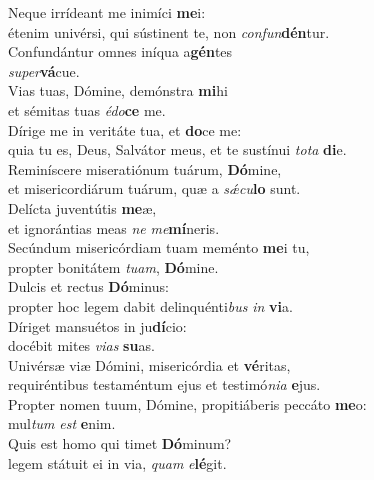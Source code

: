 \evenverse Neque irrídeant me inimíci \textbf{me}i:~\*\\
\evenverse étenim univérsi, qui sústinent te, non \textit{con}\textit{fun}\textbf{dén}tur.\\
\oddverse Confundántur omnes iníqua a\textbf{gén}tes~\*\\
\oddverse \textit{su}\textit{per}\textbf{vá}cue.\\
\evenverse Vias tuas, Dómine, demónstra \textbf{mi}hi~\*\\
\evenverse et sémitas tuas \textit{é}\textit{do}\textbf{ce} me.\\
\oddverse Dírige me in veritáte tua, et \textbf{do}ce me:~\*\\
\oddverse quia tu es, Deus, Salvátor meus, et te sustínui \textit{to}\textit{ta} \textbf{di}e.\\
\evenverse Reminíscere miseratiónum tuárum, \textbf{Dó}mine,~\*\\
\evenverse et misericordiárum tuárum, quæ a \textit{sǽ}\textit{cu}\textbf{lo} sunt.\\
\oddverse Delícta juventútis \textbf{me}æ,~\*\\
\oddverse et ignorántias meas \textit{ne} \textit{me}\textbf{mí}neris.\\
\evenverse Secúndum misericórdiam tuam meménto \textbf{me}i tu,~\*\\
\evenverse propter bonitátem \textit{tu}\textit{am}, \textbf{Dó}mine.\\
\oddverse Dulcis et rectus \textbf{Dó}minus:~\*\\
\oddverse propter hoc legem dabit delinquénti\textit{bus} \textit{in} \textbf{vi}a.\\
\evenverse Díriget mansuétos in ju\textbf{dí}cio:~\*\\
\evenverse docébit mites \textit{vi}\textit{as} \textbf{su}as.\\
\oddverse Univérsæ viæ Dómini, misericórdia et \textbf{vé}ritas,~\*\\
\oddverse requiréntibus testaméntum ejus et testimó\textit{ni}\textit{a} \textbf{e}jus.\\
\evenverse Propter nomen tuum, Dómine, propitiáberis peccáto \textbf{me}o:~\*\\
\evenverse mul\textit{tum} \textit{est} \textbf{e}nim.\\
\oddverse Quis est homo qui timet \textbf{Dó}minum?~\*\\
\oddverse legem státuit ei in via, \textit{quam} \textit{e}\textbf{lé}git.\\
